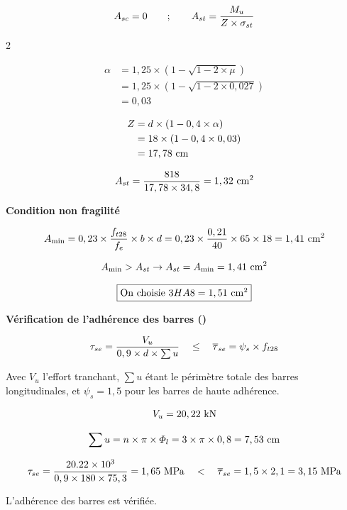 \[ A_{sc} = 0 \qquad;\qquad A_{st} = \dfrac{M_{u}}{Z \times \sigma_{st}} \]


\begin{multicols}{2}

	\[ \begin{aligned}
		\alpha &= 1,25 \times (1 - \sqrt{1 - 2 \times \mu}) \\
		&= 1,25 \times (1 - \sqrt{1 - 2 \times 0,027}) \\
		&= 0,03 
	\end{aligned}\]
	
	\[ \begin{aligned}
		Z &= d \times (1 - 0,4 \times \alpha)\\
		&= 18 \times (1 - 0,4 \times 0,03)\\
		&= 17,78\cml
	\end{aligned} \]

\end{multicols}


\[ A_{st} = \dfrac{818}{17,78 \times 34,8} = 1,32\cmsq \]

\vspace{2\baselineskip}

\textbf{Condition non fragilité}

\[ A_{\min} = 0,23 \times \dfrac{f_{t28}}{f_{e}} \times b \times d = 0,23 \times \dfrac{0,21}{40} \times 65 \times 18 = 1,41\cmsq \]

\[ A_{\min} > A_{st} \rightarrow A_{st} = A_{\min} = 1,41\cmsq \]

\[ \fbox{On choisie $3HA8 = 1,51\cmsq$} \]

\vspace{2\baselineskip}

\textbf{Vérification de l'adhérence des barres (\cite[A.6.1.3]{BAEL})}

\[ \tau_{se} = \dfrac{V_{u}}{0,9 \times d \times \sum u} \quad\leq\quad \overline{\tau}_{se} = \psi_{s} \times f_{t28} \]

Avec $V_{u}$ l'effort tranchant, $\sum u$ étant le périmètre totale des barres longitudinales, et $\psi_{s} = 1,5$ pour les barres de haute adhérence.

\[ V_{u} = 20,22\kn \]

\[ \sum u = n \times \pi \times \varPhi_{l} = 3 \times \pi \times 0,8 = 7,53\cml \]

\[ \tau_{se} = \dfrac{\num{20,22e3}}{0,9 \times 180 \times 75,3} = 1,65\mpa \quad<\quad \taubar{se} = 1,5 \times 2,1 = 3,15\mpa \]
{\centering L'adhérence des barres est vérifiée. \par}


